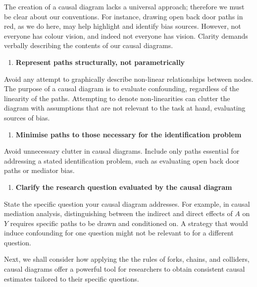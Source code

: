 \documentclass[
  singlecolumn]{article}
\providecommand{\tightlist}{%
  \setlength{\itemsep}{0pt}\setlength{\parskip}{0pt}}\usepackage{longtable,booktabs,array}
\begin{document}
The creation of a causal diagram lacks a universal approach; therefore
we must be clear about our conventions. For instance, drawing open back
door paths in red, as we do here, may help highlight and identify bias
sources. However, not everyone has colour vision, and indeed not
everyone has vision. Clarity demands verbally describing the contents of
our causal diagrams.

\begin{enumerate}
\def\labelenumi{\arabic{enumi}.}
\setcounter{enumi}{6}
\tightlist
\item
  \textbf{Represent paths structurally, not parametrically}
\end{enumerate}

Avoid any attempt to graphically describe non-linear relationships
between nodes. The purpose of a causal diagram is to evaluate
confounding, regardless of the linearity of the paths. Attempting to
denote non-linearities can clutter the diagram with assumptions that are
not relevant to the task at hand, evaluating sources of bias.

\begin{enumerate}
\def\labelenumi{\arabic{enumi}.}
\setcounter{enumi}{7}
\tightlist
\item
  \textbf{Minimise paths to those necessary for the identification
  problem}
\end{enumerate}

Avoid unnecessary clutter in causal diagrams. Include only paths
essential for addressing a stated identification problem, such as
evaluating open back door paths or mediator bias.

\begin{enumerate}
\def\labelenumi{\arabic{enumi}.}
\setcounter{enumi}{8}
\tightlist
\item
  \textbf{Clarify the research question evaluated by the causal diagram}
\end{enumerate}

State the specific question your causal diagram addresses. For example,
in causal mediation analysis, distinguishing between the indirect and
direct effects of \(A\) on \(Y\) requires specific paths to be drawn and
conditioned on. A strategy that would induce confounding for one
question might not be relevant to for a different question.

Next, we shall consider how applying the the rules of forks, chains, and
colliders, causal diagrams offer a powerful tool for researchers to
obtain consistent causal estimates tailored to their specific questions.
\end{document}
